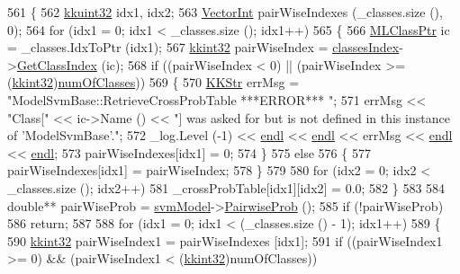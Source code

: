 \begin{DoxyCode}
561 \{
562   \hyperlink{namespace_k_k_b_af8d832f05c54994a1cce25bd5743e19a}{kkuint32}  idx1, idx2;
563   \hyperlink{namespace_k_k_b_a791ebe73f89917067a7aab9dbd817e45}{VectorInt}  pairWiseIndexes (\_classes.size (), 0);
564   \textcolor{keywordflow}{for}  (idx1 = 0;  idx1 < \_classes.size ();  idx1++)
565   \{
566     \hyperlink{class_k_k_m_l_l_1_1_m_l_class}{MLClassPtr}  ic = \_classes.IdxToPtr (idx1);
567     \hyperlink{namespace_k_k_b_a8fa4952cc84fda1de4bec1fbdd8d5b1b}{kkint32} pairWiseIndex = \hyperlink{class_k_k_m_l_l_1_1_model_adbb9475e16bb2c3eef52170485e3018e}{classesIndex}->\hyperlink{class_k_k_m_l_l_1_1_m_l_class_index_list_a9fadd1a6477ef0decfe0ff6b5db9daed}{GetClassIndex} (ic);
568     \textcolor{keywordflow}{if}  ((pairWiseIndex < 0)  ||  (pairWiseIndex >= (\hyperlink{namespace_k_k_b_a8fa4952cc84fda1de4bec1fbdd8d5b1b}{kkint32})\hyperlink{class_k_k_m_l_l_1_1_model_ad41340e916a5ccdae7ed38d9546a8445}{numOfClasses}))
569     \{
570       \hyperlink{class_k_k_b_1_1_k_k_str}{KKStr}  errMsg = \textcolor{stringliteral}{"ModelSvmBase::RetrieveCrossProbTable  ***ERROR***   "};
571       errMsg << \textcolor{stringliteral}{"Class["} << ic->Name () << \textcolor{stringliteral}{"] was asked for but is not defined in this instance of
       'ModelSvmBase'."};
572       \_log.Level (-1) << \hyperlink{namespace_k_k_b_ad1f50f65af6adc8fa9e6f62d007818a8}{endl} << \hyperlink{namespace_k_k_b_ad1f50f65af6adc8fa9e6f62d007818a8}{endl} << errMsg << \hyperlink{namespace_k_k_b_ad1f50f65af6adc8fa9e6f62d007818a8}{endl} << \hyperlink{namespace_k_k_b_ad1f50f65af6adc8fa9e6f62d007818a8}{endl};
573       pairWiseIndexes[idx1] = 0;
574     \}
575     \textcolor{keywordflow}{else}
576     \{
577       pairWiseIndexes[idx1] = pairWiseIndex;
578     \}
579 
580     \textcolor{keywordflow}{for}  (idx2 = 0;  idx2 < \_classes.size ();  idx2++)
581       \_crossProbTable[idx1][idx2] = 0.0;
582   \}
583 
584   \textcolor{keywordtype}{double}** pairWiseProb = \hyperlink{class_k_k_m_l_l_1_1_model_svm_base_a8f6ed793dfaa080ddea8e1776d2ee755}{svmModel}->\hyperlink{struct_s_v_m289___m_f_s_1_1_svm___model_a0e4118b531080a8e860b76d4eadcfd80}{PairwiseProb} ();
585   \textcolor{keywordflow}{if}  (!pairWiseProb)
586     \textcolor{keywordflow}{return};
587 
588   \textcolor{keywordflow}{for}  (idx1 = 0;  idx1 < (\_classes.size () - 1);  idx1++)
589   \{
590     \hyperlink{namespace_k_k_b_a8fa4952cc84fda1de4bec1fbdd8d5b1b}{kkint32} pairWiseIndex1 = pairWiseIndexes [idx1];
591     \textcolor{keywordflow}{if}  ((pairWiseIndex1 >= 0)  &&  (pairWiseIndex1 < (\hyperlink{namespace_k_k_b_a8fa4952cc84fda1de4bec1fbdd8d5b1b}{kkint32})numOfClasses))

\end{DoxyCode}
